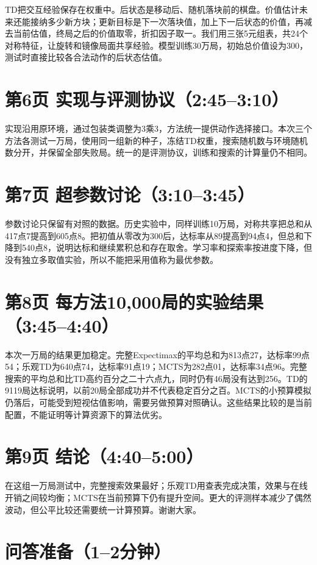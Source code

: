 \documentclass[UTF8,zihao=-4,fontset=none]{ctexart}
\begin{document}
TD把交互经验保存在权重中。后状态是移动后、随机落块前的棋盘。价值估计未来还能接纳多少新方块；更新目标是下一次落块值，加上下一后状态的价值，再减去当前估值，终局之后的价值取零，折扣因子取一。我们用三张5元组表，共24个对称特征，让旋转和镜像局面共享经验。模型训练30万局，初始总价值设为300，测试时直接比较各合法动作的后状态估值。

\section*{第6页 实现与评测协议（2:45--3:10）}

实现沿用原环境，通过包装类调整为3乘3，方法统一提供动作选择接口。本次三个方法各测试一万局，使用同一组新的种子，冻结TD权重，搜索随机数与环境随机数分开，并保留全部失败局。统一的是评测协议，训练和搜索的计算量仍不相同。

\section*{第7页 超参数讨论（3:10--3:45）}

参数讨论只保留有对照的数据。历史实验中，同样训练10万局，对称共享把总和从417点7提高到605点8。把初值从零改为300后，达标率从89提高到94点4，但总和下降到540点8，说明达标和继续累积总和存在取舍。学习率和探索率按进度下降，但没有独立多取值实验，所以不能把采用值称为最优参数。

\section*{第8页 每方法10,000局的实验结果（3:45--4:40）}

本次一万局的结果更加稳定。完整Expectimax的平均总和为813点27，达标率99点54；乐观TD为640点74，达标率91点19；MCTS为282点01，达标率34点96。完整搜索的平均总和比TD高约百分之二十六点九，同时仍有46局没有达到256。TD的9119局达标说明，以前20局全部成功并不代表稳定百分之百。MCTS的小预算模拟仍落后，可能受到短视估值影响，需要另做预算对照确认。这些结果比较的是当前配置，不能证明等计算资源下的算法优劣。

\section*{第9页 结论（4:40--5:00）}

在这组一万局测试中，完整搜索效果最好；乐观TD用查表完成决策，效果与在线开销之间较均衡；MCTS在当前预算下仍有提升空间。更大的评测样本减少了偶然波动，但公平比较还需要统一计算预算。谢谢大家。

\section*{问答准备（1--2分钟）}
\end{document}
